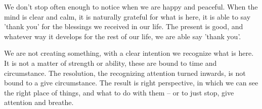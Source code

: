 We don't stop often enough to notice when we are happy and peaceful.
When the mind is clear and calm, it is naturally grateful for what is
here, it is able to say 'thank you' for the blessings we received in our
life. The present is good, and whatever way it develops for the rest of
our life, we are able say 'thank you'.

We are not creating something, with a clear intention we recognize what
is here. It is not a matter of strength or ability, these are bound to
time and circumstance. The resolution, the recognizing attention turned
inwards, is not bound to a give circumstance. The result is right
perspective, in which we can see the right place of things, and what to
do with them -- or to just stop, give attention and breathe.
